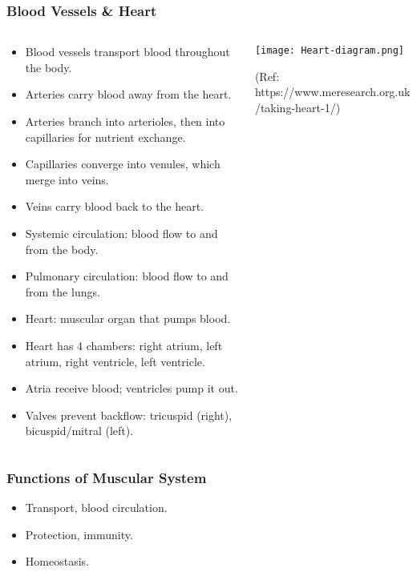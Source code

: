 \begin{frame}[fragile]\frametitle{Blood Vessels \& Heart}
\begin{columns}
    \begin{column}[T]{0.5\linewidth}
      \begin{itemize}
		\item Blood vessels transport blood throughout the body.
		\item Arteries carry blood away from the heart.
		\item Arteries branch into arterioles, then into capillaries for nutrient exchange.
		\item Capillaries converge into venules, which merge into veins.
		\item Veins carry blood back to the heart.
		\item Systemic circulation: blood flow to and from the body.
		\item Pulmonary circulation: blood flow to and from the lungs.
		\item Heart: muscular organ that pumps blood.
		\item Heart has 4 chambers: right atrium, left atrium, right ventricle, left ventricle.
		\item Atria receive blood; ventricles pump it out.
		\item Valves prevent backflow: tricuspid (right), bicuspid/mitral (left).
	  \end{itemize}
    \end{column}
    \begin{column}[T]{0.5\linewidth}
		\begin{center}
		\texttt{[image: Heart-diagram.png]}
				
		{\tiny (Ref: https://www.meresearch.org.uk/taking-heart-1/)}
		\end{center}	
    \end{column}
  \end{columns}
\end{frame}

\begin{frame}[fragile]\frametitle{Functions of Muscular System }

      \begin{itemize}
		\item Transport, blood circulation.
		\item Protection, immunity.
		\item Homeostasis.
	  \end{itemize}

\end{frame}

